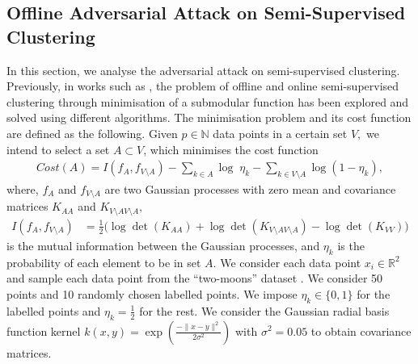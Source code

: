 \documentclass{article}
\theoremstyle{plain}
\theoremstyle{definition}
\theoremstyle{remark}
\newcommand{\N}{\mathbb{N}}
\begin{document}
\subsection{Offline Adversarial Attack on Semi-Supervised Clustering}\label{sec:offex1}
In this section, we analyse the adversarial attack on semi-supervised clustering. Previously, in works such as \cite{bach2013learning,farzin2025minimisationsubmodular}, the problem of offline and online semi-supervised clustering through minimisation of a submodular function has been explored and solved using different algorithms. The minimisation problem and its cost function are defined as the following.
Given $p\in \N$ data points in a certain set $V,$ we intend 
to select a set $A\subset V$, which minimises the
cost function
\begin{align*}
    Cost(A) \!=\! I(f_A,f_{V\setminus A}) \!-\!\! \sum_{k\in A}\log\; \eta_k \!-\!\!\! \sum_{k\in V\setminus A} \log (1-\eta_k),
\end{align*}
where, 
$f_A$ and $f_{V\setminus A}$ are two Gaussian processes with zero mean and covariance matrices $K_{AA}$ and $K_{{V\setminus A} {V\setminus A}},$
\begin{align*}
 I(f_A,f_{V\setminus A})&=\tfrac{1}{2}\big(\log\!\det(K_{AA})+\log\!\det(K_{{V\setminus A} {V\setminus A}})  -\log\!\det(K_{VV})\big)
\end{align*}
is the mutual information between the Gaussian processes, and $\eta_k$ is the probability of each element to be in set $A.$  We consider each data point $x_i\in\mathbb{R}^2$ and sample each data point from the “two-moons” dataset \cite{bach2013learning}. We consider 50 points and 10 randomly chosen labelled points. We impose $\eta_k\in\{0,1\}$ for the labelled points and $\eta_k=\tfrac{1}{2}$ for the rest. We consider the Gaussian radial basis function kernel $k(x,y) = \exp(\frac{-\|x-y\|^2}{2\sigma^2})$ with $\sigma^2=0.05$ to obtain covariance matrices.
\end{document}
